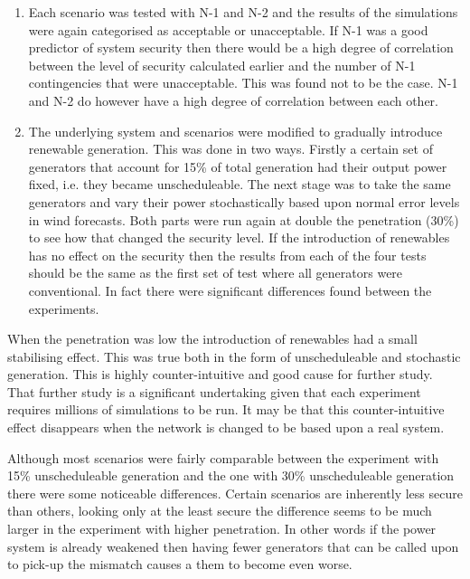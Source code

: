 \documentclass[a4paper,oneside,12pt]{report}
\begin{document}
\begin{enumerate}

\item Each scenario was tested with N-1 and N-2 and the results of the simulations were again categorised as acceptable or unacceptable. If N-1 was a good predictor of system security then there would be a high degree of correlation between the level of security calculated earlier and the number of N-1 contingencies that were unacceptable. This was found not to be the case. N-1 and N-2 do however have a high degree of correlation between each other. 

\item The underlying system and scenarios were modified to gradually introduce renewable generation. This was done in two ways. Firstly a certain set of generators that account for 15\% of total generation had their output power fixed, i.e. they became unscheduleable. The next stage was to take the same generators and vary their power stochastically based upon normal error levels in wind forecasts. Both parts were run again at double the penetration (30\%) to see how that changed the security level. If the introduction of renewables has no effect on the security then the results from each of the four tests should be the same as the first set of test where all generators were conventional. In fact there were significant differences found between the experiments.

\end{enumerate}

When the penetration was low the introduction of renewables had a small stabilising effect. This was true both in the form of unscheduleable and stochastic generation. This is highly counter-intuitive and good cause for further study. That further study is a significant undertaking given that each experiment requires millions of simulations to be run. It may be that this counter-intuitive effect disappears when the network is changed to be based upon a real system. 

Although most scenarios were fairly comparable between the experiment with 15\% unscheduleable generation and the one with 30\% unscheduleable generation there were some noticeable differences. Certain scenarios are inherently less secure than others, looking only at the least secure the difference seems to be much larger in the experiment with higher penetration. In other words if the power system is already weakened then having fewer generators that can be called upon to pick-up the mismatch causes a them to become even worse.
\end{document}
